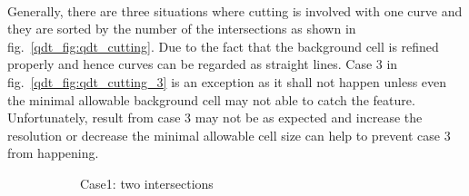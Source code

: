 \paragraph{}
Generally, there are three situations where cutting is involved with one curve and they are sorted by the number of the intersections as shown in fig.~\ref{qdt_fig:qdt_cutting}.
Due to the fact that the background cell is refined properly and hence curves can be regarded as straight lines.
Case 3 in fig.~\ref{qdt_fig:qdt_cutting_3} is an exception as it shall not happen unless even the minimal allowable background cell may not able to catch the feature.
Unfortunately, result from case 3 may not be as expected and increase the resolution or decrease the minimal allowable cell size can help to prevent case 3 from happening.
\begin{figure}[!ht]
    \begin{subfigure}[b]{0.3\linewidth}
        \caption{Case1: two intersections}
        \label{qdt_fig:qdt_cutting_2}
    \end{subfigure}
    \begin{subfigure}[b]{0.3\linewidth}
        \label{qdt_fig:qdt_cutting_1}

\end{subfigure}
\end{figure}
